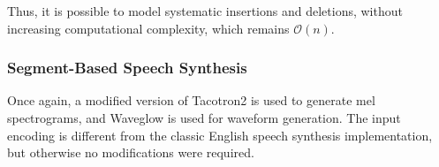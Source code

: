 Thus, it is possible to model systematic insertions and deletions, without increasing computational 
complexity, which remains $\mathcal{O}(n)$.

\subsubsection{Segment-Based Speech Synthesis}
Once again, a modified version of Tacotron2 is used to generate mel spectrograms, 
and Waveglow is used for waveform generation. The input encoding is different from the classic 
English speech synthesis implementation, but otherwise no modifications were required.
